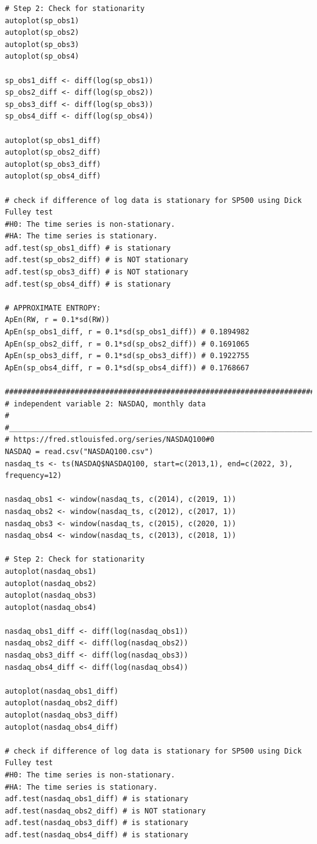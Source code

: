 \documentclass{article}[12pt]
\begin{document}
\begin{appendices}
\begin{lstlisting}
# Step 2: Check for stationarity
autoplot(sp_obs1)
autoplot(sp_obs2)  
autoplot(sp_obs3)   
autoplot(sp_obs4)  

sp_obs1_diff <- diff(log(sp_obs1))
sp_obs2_diff <- diff(log(sp_obs2))
sp_obs3_diff <- diff(log(sp_obs3))
sp_obs4_diff <- diff(log(sp_obs4))

autoplot(sp_obs1_diff) 
autoplot(sp_obs2_diff) 
autoplot(sp_obs3_diff) 
autoplot(sp_obs4_diff) 

# check if difference of log data is stationary for SP500 using Dick Fulley test
#H0: The time series is non-stationary.
#HA: The time series is stationary.
adf.test(sp_obs1_diff) # is stationary
adf.test(sp_obs2_diff) # is NOT stationary
adf.test(sp_obs3_diff) # is NOT stationary
adf.test(sp_obs4_diff) # is stationary

# APPROXIMATE ENTROPY:
ApEn(RW, r = 0.1*sd(RW))
ApEn(sp_obs1_diff, r = 0.1*sd(sp_obs1_diff)) # 0.1894982
ApEn(sp_obs2_diff, r = 0.1*sd(sp_obs2_diff)) # 0.1691065
ApEn(sp_obs3_diff, r = 0.1*sd(sp_obs3_diff)) # 0.1922755
ApEn(sp_obs4_diff, r = 0.1*sd(sp_obs4_diff)) # 0.1768667

################################################################################
# independent variable 2: NASDAQ, monthly data                                 #
#______________________________________________________________________________#
# https://fred.stlouisfed.org/series/NASDAQ100#0
NASDAQ = read.csv("NASDAQ100.csv")
nasdaq_ts <- ts(NASDAQ$NASDAQ100, start=c(2013,1), end=c(2022, 3), frequency=12)

nasdaq_obs1 <- window(nasdaq_ts, c(2014), c(2019, 1))
nasdaq_obs2 <- window(nasdaq_ts, c(2012), c(2017, 1))
nasdaq_obs3 <- window(nasdaq_ts, c(2015), c(2020, 1))
nasdaq_obs4 <- window(nasdaq_ts, c(2013), c(2018, 1))

# Step 2: Check for stationarity
autoplot(nasdaq_obs1)
autoplot(nasdaq_obs2)
autoplot(nasdaq_obs3)
autoplot(nasdaq_obs4)

nasdaq_obs1_diff <- diff(log(nasdaq_obs1))
nasdaq_obs2_diff <- diff(log(nasdaq_obs2))
nasdaq_obs3_diff <- diff(log(nasdaq_obs3))
nasdaq_obs4_diff <- diff(log(nasdaq_obs4))

autoplot(nasdaq_obs1_diff)
autoplot(nasdaq_obs2_diff)
autoplot(nasdaq_obs3_diff)
autoplot(nasdaq_obs4_diff)

# check if difference of log data is stationary for SP500 using Dick Fulley test
#H0: The time series is non-stationary.
#HA: The time series is stationary.
adf.test(nasdaq_obs1_diff) # is stationary
adf.test(nasdaq_obs2_diff) # is NOT stationary
adf.test(nasdaq_obs3_diff) # is stationary
adf.test(nasdaq_obs4_diff) # is stationary


\end{lstlisting}
\end{appendices}
\end{document}
